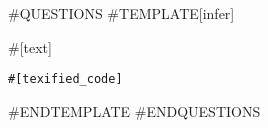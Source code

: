 \documentclass[a4paper]{article}
\newenvironment{exercise}{
  \begin{framed}}{
  \end{framed}}
\begin{document}
#QUESTIONS
#TEMPLATE[infer]
\begin{exercise}
\noindent #[text]
\begin{lstlisting}[language=MyJava]
#[texified_code]
\end{lstlisting}
\end{exercise}
\clearpage
#ENDTEMPLATE
#ENDQUESTIONS
\end{document}
